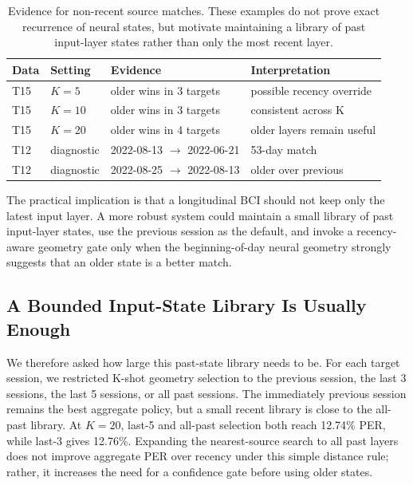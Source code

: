 \documentclass[10pt]{article}
\begin{document}
\begin{table}[t]
\centering
\caption{Evidence for non-recent source matches. These examples do not prove
exact recurrence of neural states, but motivate maintaining a library of past
input-layer states rather than only the most recent layer.}
\begin{tabular}{llll}
\toprule
Data & Setting & Evidence & Interpretation \\
\midrule
T15 & $K=5$ & older wins in 3 targets & possible recency override \\
T15 & $K=10$ & older wins in 3 targets & consistent across K \\
T15 & $K=20$ & older wins in 4 targets & older layers remain useful \\
T12 & diagnostic & 2022-08-13 $\rightarrow$ 2022-06-21 & 53-day match \\
T12 & diagnostic & 2022-08-25 $\rightarrow$ 2022-08-13 & older over previous \\
\bottomrule
\end{tabular}
\end{table}

The practical implication is that a longitudinal BCI should not keep only the
latest input layer. A more robust system could maintain a small library of past
input-layer states, use the previous session as the default, and invoke a
recency-aware geometry gate only when the beginning-of-day neural geometry
strongly suggests that an older state is a better match.

\subsection{A Bounded Input-State Library Is Usually Enough}
We therefore asked how large this past-state library needs to be. For each target
session, we restricted K-shot geometry selection to the previous session, the last
3 sessions, the last 5 sessions, or all past sessions. The immediately previous
session remains the best aggregate policy, but a small recent library is close to
the all-past library. At $K=20$, last-5 and all-past selection both reach
12.74\% PER, while last-3 gives 12.76\%. Expanding the nearest-source search to
all past layers does not improve aggregate PER over recency under this simple
distance rule; rather, it increases the need for a confidence gate before using
older states.
\end{document}
